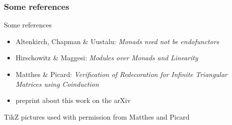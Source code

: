 \documentclass[
serif,
mathsans,
]
{beamer}
\begin{document}
\begin{frame}
 \frametitle{Some references}
 
  
  
  \begin{block}{Some references}
   \begin{itemize}
    \item Altenkirch, Chapman \& Uustalu: \emph{Monads need not be endofunctors}
    \item Hirschowitz \& Maggesi: \emph{Modules over Monads and Linearity}
    \item Matthes \& Picard: \emph{Verification of Redecoration for Infinite Triangular Matrices using Coinduction}
    \item preprint about this work on the arXiv
   \end{itemize}
  \end{block}

  TikZ pictures used with permission from Matthes and Picard
 
\end{frame}
\end{document}
